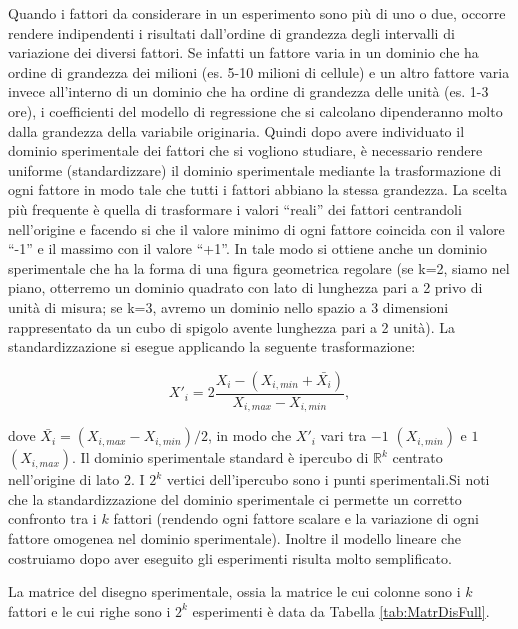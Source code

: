 \documentclass[
  11pt,
]{book}
\begin{document}
Quando i fattori da considerare in un esperimento sono più di uno o due,
occorre rendere indipendenti i risultati dall'ordine di grandezza degli
intervalli di variazione dei diversi fattori. Se infatti un fattore
varia in un dominio che ha ordine di grandezza dei milioni (es. 5-10
milioni di cellule) e un altro fattore varia invece all'interno di un
dominio che ha ordine di grandezza delle unità (es. 1-3 ore), i
coefficienti del modello di regressione che si calcolano dipenderanno
molto dalla grandezza della variabile originaria. Quindi dopo avere
individuato il dominio sperimentale dei fattori che si vogliono
studiare, è necessario rendere uniforme (standardizzare) il dominio
sperimentale mediante la trasformazione di ogni fattore in modo tale che
tutti i fattori abbiano la stessa grandezza. La scelta più frequente è
quella di trasformare i valori ``reali'' dei fattori centrandoli
nell'origine e facendo si che il valore minimo di ogni fattore coincida
con il valore ``-1'' e il massimo con il valore ``+1''. In tale modo si
ottiene anche un dominio sperimentale che ha la forma di una figura
geometrica regolare (se k=2, siamo nel piano, otterremo un dominio
quadrato con lato di lunghezza pari a 2 privo di unità di misura; se
k=3, avremo un dominio nello spazio a 3 dimensioni rappresentato da un
cubo di spigolo avente lunghezza pari a 2 unità). La standardizzazione
si esegue applicando la seguente trasformazione:

\[
X'_i=2\frac{X_i-(X_{i,min}+\bar{X_i})}{X_{i,max}-X_{i,min}},
\]

dove \(\bar{X_i}=(X_{i,max}-X_{i,min})/2\), in modo che \(X'_i\) vari tra
\(-1\) \((X_{i,min})\) e \(1\) \((X_{i,max})\). Il dominio sperimentale standard
è ipercubo di \(\mathbb{R}^k\) centrato nell'origine di lato \(2\). I \(2^k\)
vertici dell'ipercubo sono i punti sperimentali.\newline Si noti che la
standardizzazione del dominio sperimentale ci permette un corretto
confronto tra i \(k\) fattori (rendendo ogni fattore scalare e la
variazione di ogni fattore omogenea nel dominio sperimentale). Inoltre
il modello lineare che costruiamo dopo aver eseguito gli esperimenti
risulta molto semplificato.

La matrice del disegno sperimentale, ossia la matrice le
cui colonne sono i \(k\) fattori e le cui righe sono i \(2^k\) esperimenti è
data da Tabella \ref{tab:MatrDisFull}.
\end{document}
